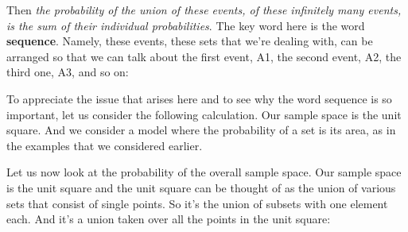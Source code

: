 \documentclass[pdftex, brazil, 12pt, twoside]{article}
\begin{document}
Then \emph{the probability of the union of these events, of
these infinitely many events, is the sum of their individual
probabilities}.
The key word here is the word \textbf{sequence}.
Namely, these events, these sets that we're dealing with,
can be arranged so that we can talk about the first event,
A1, the second event, A2, the third one, A3, and so on:

\begin{figure}[H]
  \begin{center}
  \end{center}
\end{figure}

To appreciate the issue that arises here and to see why the
word sequence is so important, let us consider the following
calculation.
Our sample space is the unit square.
And we consider a model where the probability of a set is
its area, as in the examples that we considered earlier.

Let us now look at the probability of the overall
sample space.
Our sample space is the unit square and the unit square can
be thought of as the union of various sets that consist of
single points.
So it's the union of subsets with one element each.
And it's a union taken over all the
points in the unit square:

\begin{figure}[H]
  \begin{center}
  \end{center}
\end{figure}
\end{document}
